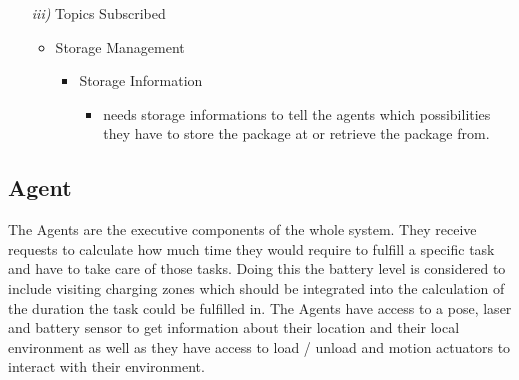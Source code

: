 \documentclass{article}
\begin{document}
\begin{enumerate}
\begin{itemize}
\begin{itemize}
\begin{itemize}
			\end{itemize}
		\end{itemize}
	\end{itemize}
	\item[\textit{iii)}] Topics Subscribed
	\begin{itemize}
		\item Storage Management
		\begin{itemize}
			\item Storage Information
			\begin{itemize}
				\item needs storage informations to tell the agents which possibilities they have to store the package at or retrieve the package from.
			\end{itemize}
		\end{itemize}
	\end{itemize}
\end{enumerate}

\subsection{Agent}
The Agents are the executive components of the whole system. They receive requests to calculate how
much time they would require to fulfill a specific task and have to take care of those tasks. Doing this the battery level is considered to include visiting charging zones which should be integrated into the calculation of the duration the task could be fulfilled in. The Agents have access to a pose, laser and battery sensor to get information about their location and their local environment as well as they have access to load / unload and motion actuators to interact with their environment.
\end{document}
